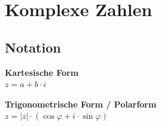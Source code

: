 \documentclass[german]{latex4ei/latex4ei_sheet}
\begin{document}
\section{Komplexe Zahlen}

\begin{sectionbox}

\subsection{Notation}
\begin{minipage}{0.39\textwidth}
	\textbf{Kartesische Form}\\
	$z = a+b \cdot i$
\end{minipage}
\begin{minipage}{0.59\textwidth}
	\textbf{Trigonometrische Form / Polarform}\\
	$z =\left| z \right| \cdot \left( \cos { \varphi } + i \cdot \sin { \varphi  } \right)$
\end{minipage}


\end{sectionbox}
\end{document}
